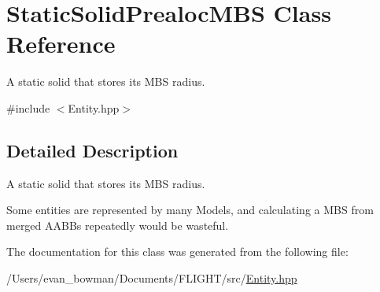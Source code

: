 \hypertarget{class_static_solid_prealoc_m_b_s}{}\section{Static\+Solid\+Prealoc\+M\+BS Class Reference}
\label{class_static_solid_prealoc_m_b_s}


A static solid that stores it\textquotesingle{}s M\+BS radius.  




{\ttfamily \#include $<$Entity.\+hpp$>$}



\subsection{Detailed Description}
A static solid that stores it\textquotesingle{}s M\+BS radius. 

Some entities are represented by many Models, and calculating a M\+BS from merged A\+A\+B\+Bs repeatedly would be wasteful. 

The documentation for this class was generated from the following file\+:\begin{DoxyCompactItemize}
\item 
/\+Users/evan\+\_\+bowman/\+Documents/\+F\+L\+I\+G\+H\+T/src/\hyperlink{_entity_8hpp}{Entity.\+hpp}\end{DoxyCompactItemize}

